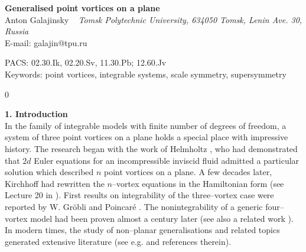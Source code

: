 \documentclass[12pt]{article}
\begin{document}
\begin{titlepage}
\setcounter{page}{0}
\begin{center}
{\LARGE\bf  Generalised point vortices on a plane}\\
\vskip 1.5cm
\textrm{\Large Anton Galajinsky \ }
\vskip 0.7cm
{\it
Tomsk Polytechnic University, 634050 Tomsk, Lenin Ave. 30, Russia
} \\
\vskip 0.1cm
{E-mail: galajin@tpu.ru}
\vskip 0.5cm
\end{center}

\begin{abstract} \noindent
A three--vortex system on a plane is known to be minimally superintegrable in the Liouville sense.
In this work, integrable generalisations of the three--vortex planar model, which involve root vectors of simple Lie algebras, are proposed. It is shown that a generalised system, which is governed by a positive definite Hamiltonian, admits a natural integrable extension by spin degrees of freedom.
It is emphasised that the $n$--vortex planar model and plenty of its generalisations enjoy the nonrelativistic scale invariance, which gives room for possible holographic applications.

\end{abstract}

\vspace{0.5cm}


PACS: 02.30.Ik, 02.20.Sv, 11.30.Pb; 12.60.Jv \\ \indent
Keywords: point vortices, integrable systems, scale symmetry, supersymmetry
\end{titlepage}
\renewcommand{\thefootnote}{\arabic{footnote}}
\setcounter{footnote}0


\noindent
{\bf 1. Introduction}\\

\noindent
In the family of integrable models with finite number of degrees of freedom, a system of three point vortices on a plane holds a special place with impressive history. The research began with the work of Helmholtz \cite{HH}, who had demonstrated that $2d$ Euler equations for an incompressible inviscid fluid admitted a particular solution which described $n$
point vortices on a plane. A few decades later, Kirchhoff had rewritten the $n$--vortex equations in the Hamiltonian form (see Lecture 20 in \cite{GK}). First results on integrability of the three--vortex case
were reported by W. Gr\"obli \cite{WG} and Poincar\'e \cite{HP}. The nonintegrability of a generic four--vortex model had been proven almost a century later \cite{Z} (see also a related work \cite{BE}). In modern times, the study of non--planar generalisations and related topics generated extensive literature (see e.g. \cite{BBM,BM,HA,PKN,MV} and references therein).
\end{document}
